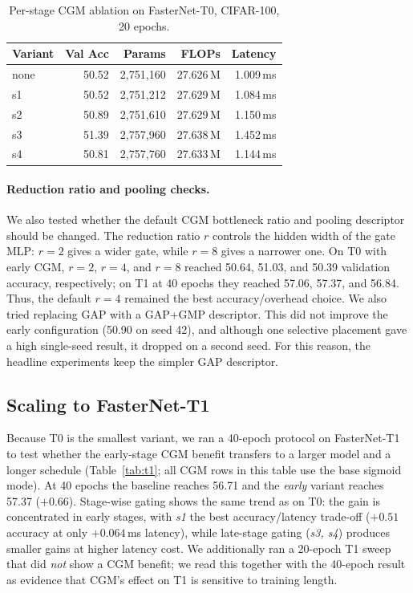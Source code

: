 \documentclass{article}
\begin{document}
\begin{table}[t]
\caption{Per-stage CGM ablation on FasterNet-T0, CIFAR-100, 20 epochs.}
\label{tab:t0-stage}
\centering
\small
\begin{tabular}{lrrrr}
\toprule
Variant & Val Acc & Params & FLOPs & Latency \\
\midrule
none & 50.52 & 2{,}751{,}160 & 27.626\,M & 1.009\,ms \\
s1   & 50.52 & 2{,}751{,}212 & 27.629\,M & 1.084\,ms \\
s2   & 50.89 & 2{,}751{,}610 & 27.629\,M & 1.150\,ms \\
s3   & 51.39 & 2{,}757{,}960 & 27.638\,M & 1.452\,ms \\
s4   & 50.81 & 2{,}757{,}760 & 27.633\,M & 1.144\,ms \\
\bottomrule
\end{tabular}
\end{table}

\paragraph{Reduction ratio and pooling checks.} We also tested whether the default CGM bottleneck ratio and pooling descriptor should be changed. The reduction ratio $r$ controls the hidden width of the gate MLP: $r{=}2$ gives a wider gate, while $r{=}8$ gives a narrower one. On T0 with early CGM, $r{=}2$, $r{=}4$, and $r{=}8$ reached 50.64, 51.03, and 50.39 validation accuracy, respectively; on T1 at 40 epochs they reached 57.06, 57.37, and 56.84. Thus, the default $r{=}4$ remained the best accuracy/overhead choice. We also tried replacing GAP with a GAP+GMP descriptor. This did not improve the early configuration (50.90 on seed 42), and although one selective placement gave a high single-seed result, it dropped on a second seed. For this reason, the headline experiments keep the simpler GAP descriptor.

\subsection{Scaling to FasterNet-T1}

Because T0 is the smallest variant, we ran a 40-epoch protocol on FasterNet-T1 to test whether the early-stage CGM benefit transfers to a larger model and a longer schedule (Table~\ref{tab:t1}; all CGM rows in this table use the base sigmoid mode). At 40 epochs the baseline reaches 56.71 and the \emph{early} variant reaches 57.37 ($+0.66$). Stage-wise gating shows the same trend as on T0: the gain is concentrated in early stages, with \emph{s1} the best accuracy/latency trade-off ($+0.51$ accuracy at only $+0.064$\,ms latency), while late-stage gating (\emph{s3, s4}) produces smaller gains at higher latency cost. We additionally ran a 20-epoch T1 sweep that did \emph{not} show a CGM benefit; we read this together with the 40-epoch result as evidence that CGM's effect on T1 is sensitive to training length.
\end{document}
